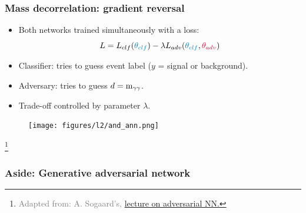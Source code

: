 \documentclass[11pt,xcolor=dvipsnames,aspectratio=169]{beamer}
\newcommand\blfootnote[1]{%
  \begingroup
  \renewcommand\thefootnote{}\footnote{\hspace{-30pt}\textcolor{Gray}{\tiny #1}}%
  \addtocounter{footnote}{-1}%
  \endgroup
}
\begin{document}
\begin{frame}
  \frametitle{\bf Mass decorrelation: gradient reversal}
  \begin{itemize}
  \item Both networks trained simultaneously with a loss:
    $$ L = L_{clf}(\textcolor{EDBBlue}{\theta_{clf}})-\lambda L_{adv}(\textcolor{EDBBlue}{\theta_{clf}},\textcolor{EDBRed}{\theta_{adv}}) $$
  \item \textcolor{EDBBlue}{Classifier:} tries to guess event label ($y$ = signal or background).
  \item \textcolor{EDBRed}{Adversary:} tries to guess $d=\mathrm{m}_{\gamma\gamma}{}$.   
  \item Trade-off controlled by parameter $\lambda$.
  \end{itemize}
  \begin{figure}
    \texttt{[image: figures/l2/and\_ann.png]}
  \end{figure}
  \blfootnote{Adapted from: A. Sogaard's,
    \href{https://github.com/asogaard/ep2mlf/blob/master/01-adversarial/2018-11-13_EP2MLF_AndreasSogaard.pdf}{lecture
    on adversarial NN.}}
\end{frame}

{
%
\begin{frame}
  \frametitle{\bf Aside: Generative adversarial network}
\end{frame}
}
\end{document}

